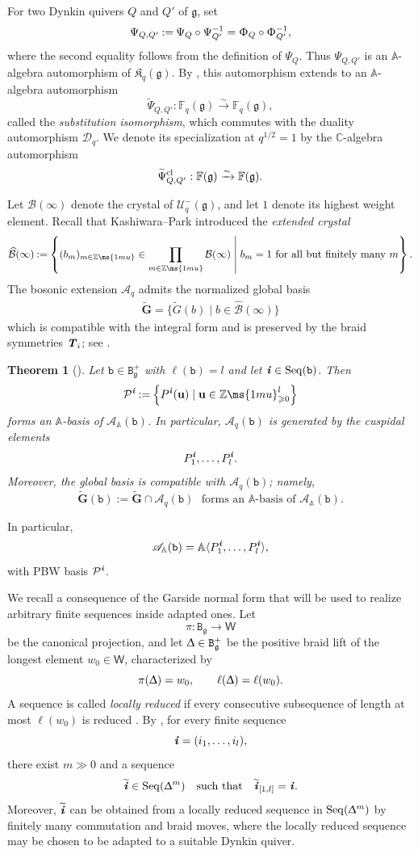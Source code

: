 \documentclass[12pt, leqno]{amsart}
\numberwithin{equation}{section}
\theoremstyle{plain}
\newtheorem{theorem}[lemma]{Theorem}
\theoremstyle{definition}
\renewcommand{\ge}{\geqslant}
\newcommand{\seteq}{\mathbin{:=}}
\newcommand{\g}{\mathfrak{g}}
\newcommand{\C}{\mathbb{C}}
\newcommand{\Z}{\mathbb{Z}\ms{1mu}}
\newcommand{\ii}{ \textbf{\textit{i}}}
\newcommand{\tG}{\widetilde{G}}
\newcommand{\tii}{{\widetilde{\ii}}}
\newcommand{\frakK}{\mathfrak{K}}
\newcommand{\sfW}{\mathsf{W}}
\newcommand{\bbA}{\mathbb{A}}
\newcommand{\bbF}{\mathbb{F}}
\newcommand{\bfG}{\mathbf{G}}
\newcommand{\tbfG}{\widetilde{\bfG}}
\newcommand{\bfu}{\mathbf{u}}
\newcommand{\calB}{\mathcal{B}}
\newcommand{\calD}{\mathcal{D}}
\newcommand{\calP}{\mathcal{P}}
\newcommand{\calU}{\mathcal{U}}
\newcommand{\hcalB}{\widehat{\calB}}
\newcommand{\scrA}{\mathscr{A}}
\newcommand{\ttB}{\mathtt{B}}
\newcommand{\ttb}{\mathtt{b}}
\newcommand{\TT}{ \textbf{\textit{T}}}
\newcommand{\Seq}{\mathrm{Seq}}
\newcommand{\tPsi}{{\widetilde{\Psi}}}
\begin{document}
 
For two Dynkin quivers $Q$ and $Q'$ of $\g$, set
\[
\Psi_{Q,Q'}
\seteq
\Psi_Q\circ\Psi_{Q'}^{-1}
=
\Upphi_Q\circ\Upphi_{Q'}^{-1},
\]
where the second equality follows from the definition of $\Psi_Q$.
Thus $\Psi_{Q,Q'}$ is an $\bbA$-algebra automorphism of
$\frakK_q(\g)$.
By \cite{FHOO2,LO24}, this automorphism extends to an
$\bbA$-algebra automorphism
\[
\tPsi_{Q,Q'}:
\bbF_q(\g)\xrightarrow{\sim}\bbF_q(\g),
\]
called the \emph{substitution isomorphism}, which commutes with the
duality automorphism $\calD_q$. We denote its specialization at $q^{1/2}=1$ by the
$\C$-algebra automorphism
\[
\tPsi^{\rm cl}_{Q,Q'}:
\bbF(\g)\xrightarrow{\sim}\bbF(\g).
\]
 
Let $\calB(\infty)$ denote the crystal of $\calU_q^-(\g)$,
and let $1$ denote its highest weight element.
Recall that Kashiwara--Park \cite{KP22} introduced the
\emph{extended crystal}
\[
\hcalB(\infty) \seteq \left\{ (b_m)_{m\in\Z}\in\prod_{m\in\Z}\calB(\infty) \;\middle|\; b_m=1\text{ for all but finitely many }m \right\}.
\]
The bosonic extension $\scrA_q$ admits the normalized global basis
\begin{align} \label{eq: nor global basis}
\tbfG   = \{\tG(b)\mid b\in\hcalB(\infty)\}
\end{align}
which is compatible with the integral form and is preserved by the
braid symmetries $\TT_i$; see
\cite{KKOP24,KKOP24B}.

\begin{theorem}[{\cite{OP24,KKOP24B}}]
\label{thm: PBW basis bosonic braid}
Let $\ttb\in\ttB_\g^+$ with $\ell(\ttb)=l$ and let
$\ii\in\Seq(\ttb)$.  Then
\[
\calP^\ii \seteq \left\{ P^\ii(\bfu) \mid \bfu\in\Z_{\ge0}^l \right\}
\]
forms an $\bbA$-basis of $\scrA_{\bbA}(\ttb)$.
In particular, $\scrA_q(\ttb)$ is generated by the cuspidal elements
\[
P_1^\ii,\ldots,P_l^\ii.
\]
Moreover, the global basis is compatible with
$\scrA_q(\ttb)$; namely,
\[
\tbfG(\ttb) \seteq \tbfG\cap\scrA_q(\ttb) \ \ \ \text{forms an $\bbA$-basis of $\scrA_{\bbA}(\ttb)$.}
\]
\end{theorem}
In particular,
\[
\scrA_\bbA(\ttb) = \bbA\langle P_1^\ii,\ldots,P_l^\ii\rangle,
\]
with PBW basis $\calP^\ii$.

We recall a consequence of the Garside normal form that will be
used to realize arbitrary finite sequences inside adapted ones.
Let
\[
\pi:\ttB_\g\longrightarrow \sfW
\]
be the canonical projection, and let $\Updelta\in\ttB_\g^+$ be the
positive braid lift of the longest element $w_0\in \sfW$, characterized by
\[
\pi(\Updelta)=w_0, \qquad \ell(\Updelta)=\ell(w_0).
\]
A sequence is called \emph{locally reduced} if every consecutive
subsequence of length at most $\ell(w_0)$ is reduced
\cite[Definition~2.3(iii)]{KKOP25M}. 
By \cite[Remark~5.4]{KKOP25M}, for every finite sequence
\[
\ii=(i_1,\ldots,i_l),
\]
there exist $m\gg0$ and a sequence
\[
\tii\in\Seq(\Updelta^m) \quad  \text{such that} \quad \tii_{[1,l]}=\ii.
\]
Moreover, $\tii$ can be obtained from a locally reduced
sequence in $\Seq(\Updelta^m)$ by finitely many commutation and braid
moves, where the locally reduced sequence may be chosen to be adapted
to a suitable Dynkin quiver.
\end{document}
